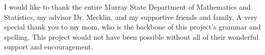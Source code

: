 
\bigskip

\indent I would like to thank the entire Murray State Department of Mathematics and Statistics, 
my advisor Dr. Mecklin, and my supportive friends and family. A very special thank you to my mom, 
who is the backbone of this project's grammar and spelling. 
This project would not have been possible without all of their wonderful support 
and encouragement. 